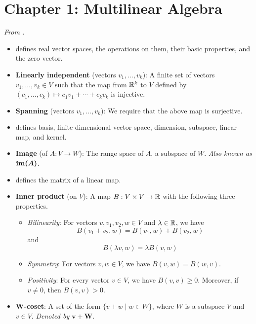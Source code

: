 \documentclass[../notes.tex]{subfiles}
\begin{document}
\section{Chapter 1: Multilinear Algebra}
\emph{From \textcite{bib:DifferentialForms}.}
\begin{itemize}
    \item {}\textcite{bib:DifferentialForms} defines real vector spaces, the operations on them, their basic properties, and the zero vector.
    \item \textbf{Linearly independent} (vectors $v_1,\dots,v_k$): A finite set of vectors $v_1,\dots,v_k\in V$ such that the map from $\mathbb{R}^k$ to $V$ defined by $(c_1,\dots,c_k)\mapsto c_1v_1+\cdots+c_kv_k$ is injective.
    \item \textbf{Spanning} (vectors $v_1,\dots,v_k$): We require that the above map is surjective.
    \item \textcite{bib:DifferentialForms} defines basis, finite-dimensional vector space, dimension, subspace, linear map, and kernel.
    \item \textbf{Image} (of $A:V\to W$): The range space of $A$, a subspace of $W$. \emph{Also known as} $\bm{\im(A)}$.
    \item \textcite{bib:DifferentialForms} defines the matrix of a linear map.
    \item \textbf{Inner product} (on $V$): A map $B:V\times V\to\mathbb{R}$ with the following three properties.
    \begin{itemize}
        \item \emph{Bilinearity}: For vectors $v,v_1,v_2,w\in V$ and $\lambda\in\mathbb{R}$, we have
        \begin{equation*}
            B(v_1+v_2,w) = B(v_1,w)+B(v_2,w)
        \end{equation*}
        and
        \begin{equation*}
            B(\lambda v,w) = \lambda B(v,w)
        \end{equation*}
        \item \emph{Symmetry}: For vectors $v,w\in V$, we have $B(v,w)=B(w,v)$.
        \item \emph{Positivity}: For every vector $v\in V$, we have $B(v,v)\geq 0$. Moreover, if $v\neq 0$, then $B(v,v)>0$.
    \end{itemize}
    \item \textbf{$\bm{W}$-coset}: A set of the form $\{v+w\mid w\in W\}$, where $W$ is a subspace $V$ and $v\in V$. \emph{Denoted by} $\bm{v+W}$.
    \begin{itemize}

\end{itemize}
\end{itemize}
\end{document}
